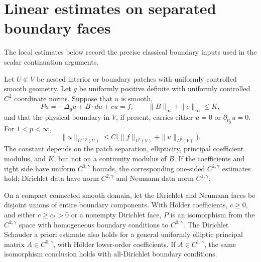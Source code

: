 \section{Linear estimates on separated boundary faces}
\label{sec:linear-estimates}

The local estimates below record the precise classical boundary inputs used in the scalar continuation arguments.

\begin{lemma}
\label{lem:linear-separated-faces}
Let $U\Subset V$ be nested interior or boundary patches with uniformly
controlled smooth geometry. Let $g$ be uniformly positive definite with
uniformly controlled $C^2$ coordinate norms. Suppose that $u$ is smooth,
\[
 Pu=-\Delta_g u+B\cdot du+cu=f,
 \qquad \|B\|_\infty+\|c\|_\infty\le K,
\]
and that the physical boundary in $V$, if present, carries either
$u=0$ or $\partial_{\nu_g}u=0$. For $1<p<\infty$,
\[
 \|u\|_{W^{2,p}(U)}
 \le C\bigl(\|f\|_{L^p(V)}+\|u\|_{L^p(V)}\bigr).
\]
The constant depends on the patch separation, ellipticity, principal
coefficient modulus, and $K$, but not on a continuity modulus of $B$.
If the coefficients and right side have uniform $C^{0,\gamma}$ bounds,
the corresponding one-sided $C^{2,\gamma}$ estimates hold; Dirichlet
data have norm $C^{2,\gamma}$ and Neumann data norm $C^{1,\gamma}$.

On a compact connected smooth domain, let the Dirichlet and Neumann
faces be disjoint unions of entire boundary components. With H\"older
coefficients, $c\ge0$, and either $c\ge c_*>0$ or a nonempty Dirichlet
face, $P$ is an isomorphism from the $C^{2,\gamma}$ space with homogeneous
boundary conditions to $C^{0,\gamma}$.
The Dirichlet Schauder a priori estimate also holds for a general
uniformly elliptic principal matrix $A\in C^{0,\gamma}$, with
H\"older lower-order coefficients. If $A\in C^{1,\gamma}$, the same
isomorphism conclusion holds with all-Dirichlet boundary conditions.
\end{lemma}

